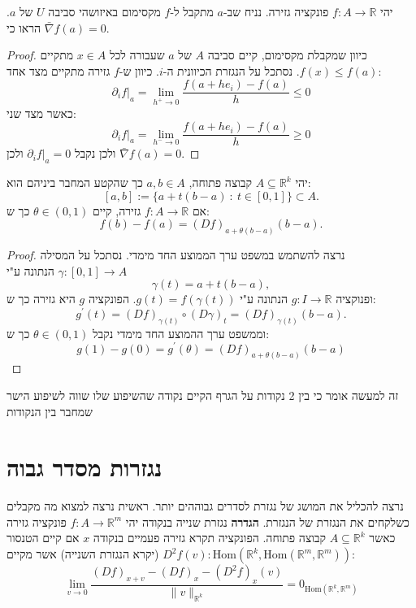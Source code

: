 \documentclass{tstextbook}
\begin{document}
\begin{proposition}
יהי \(f:A\to\mathbb{R}\) פונקציה גזירה. נניח שב-\(a\) מתקבל ל-\(f\) מקסימום באיזושהי סביבה \(U\) של \(a\). הראו כי \(\bar{\nabla}f(a)=0\).

\end{proposition}
\begin{proof}
כיוון שמקבלת מקסימום, קיים סביבה \(A\) של \(a\) שעבורה לכל \(x \in A\) מתקיים \(f(x)\leq f(a)\). נסתכל על הנגזרת הכיוונית ה-\(i\). כיוון ש-\(f\) גזירה מתקיים מצד אחד:
$$\partial_{i} f|_{a}=\lim_{ h^+ \to 0 } \frac{f(a+he_{i})-f(a)}{h}\leq 0$$
כאשר מצד שני:
$$\partial_{i} f|_{a}=\lim_{ h^- \to 0 } \frac{f(a+he_{i})-f(a)}{h}\geq 0$$
ולכן נקבל \(\partial_{i}f|_{a}=0\) ולכן \(\bar{\nabla}f(a)=0\).

\end{proof}
\begin{theorem}
יהי \(A\subseteq \mathbb{R}^k\) קבוצה פתוחה, \(a,b\in A\) כך שהקטע המחבר ביניהם הוא:
$$[a,b]:=\{a+t(b-a)\::\:t\in[0,1]\}\subset A.$$
אם \(f:A\to\mathbb{R}\) גזירה, קיים \(\theta \in(0,1)\) כך ש:
$$f(b)-f(a)=(D f)_{a+\theta(b-a)}(b-a).$$

\end{theorem}
\begin{proof}
נרצה להשתמש במשפט ערך הממוצע החד מימדי. נסתכל על המסילה \(\gamma:[0,1]\to A\) הנתונה ע"י $$\gamma(t)=a+t(b-a),$$ ופנוקציה \(g:I\to\mathbb{R}\) הנתונה ע"י \(g(t)=f\left( \gamma(t) \right)\). הפונקציה \(g\) היא גזירה כך ש:
$$g^{\prime}(t)=(D f)_{\gamma(t)}\circ(D\gamma)_{t}=(D f)_{\gamma(t)}(b-a).$$
וממשפט ערך ההמוצע החד מימדי נקבל \(\theta \in(0,1)\) כך ש:
$$g(1)-g(0)=g^{\prime}(\theta)=(D f)_{a+\theta(b-a)}(b-a)$$

\end{proof}
זה למעשה אומר כי בין 2 נקודות על הגרף הקיים נקודה שהשיפוע שלו שווה לשיפוע הישר שמחבר בין הנקודות

\section{נגזרות מסדר גבוה}

נרצה להכליל את המושג של נגזרת לסדרים גבוההים יותר. ראשית נרצה למצוא מה מקבלים כשלקחים את הנגזרת של הנגזרת.
\textbf{הגדרה} נגזרת שנייה בנקודה
יהי \(f:A\to\mathbb{R}^m\) פונקציה גזירה כאשר \(A\subseteq \mathbb{R}^k\) קבוצה פתוחה. הפונקציה תקרא גזירה פעמיים בנקודה \(x\) אם קיים הטנסור \(D^2f(v):\mathrm{Hom}\left( \mathbb{R}^k,\mathrm{Hom}\left( \mathbb{R}^m,\mathbb{R}^m \right) \right)\) (יקרא הנגזרת השנייה) אשר מקיים:
$$ \lim\limits_{ v \to0}\frac{(Df)_{x+ v }-(Df)_x-(D^2f)_x\left(  v  \right)}{\| v \|_{\mathbb{R}^k}}=0_{\mathrm{Hom}\left( \mathbb{R}^k,\mathbb{R}^m \right)}$$
\end{document}
